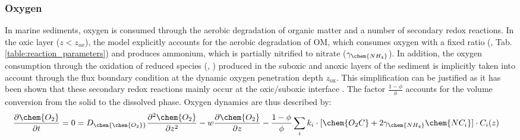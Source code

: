 \documentclass[gmd, manuscript]{copernicus}
\begin{document}
\subsubsection{Oxygen}
In marine sediments, oxygen is consumed through the aerobic degradation of organic matter and a number of secondary redox reactions. 
In the oxic layer ($z<z_{ox}$), the model explicitly accounts for the aerobic degradation of OM, which consumes oxygen with a fixed  ratio (, Tab. \ref{table:reaction_parameters}) 
and produces ammonium, which is partially nitrified to nitrate ($\gamma_\chem{NH_4}$).
In addition, the oxygen consumption through the oxidation of reduced species (, ) produced in the suboxic and anoxic layers of the sediment is implicitly taken into account 
through the flux boundary condition at the dynamic oxygen penetration depth $z_{\mathrm{ox}}$. This simplification can be justified as it has been shown that these secondary redox reactions mainly occur at the oxic/suboxic 
interface \citep{soetaert_model_1996}.  
The factor $\frac{1-\phi}{\phi}$ accounts for the volume conversion from the solid to the dissolved phase. 
Oxygen dynamics are thus described by:
\begin{align} 
 \frac{\partial \chem{O_2}}{\partial t} &= 0= D_{\chem{ \chem{O_2}}}\frac{\partial^2  \chem{O_2} }{\partial z^2} - w\frac{\partial  \chem{O_2}}{\partial z} - \frac{1-\phi}{\phi}\sum_i k_i \cdot [ \chem{O_2C} + 2 \gamma_{\chem{NH_4}} \chem{NC_i} ]\cdot C_{i}(z) \label{eq:ODE_O2_1}
\end{align}
\end{document}
